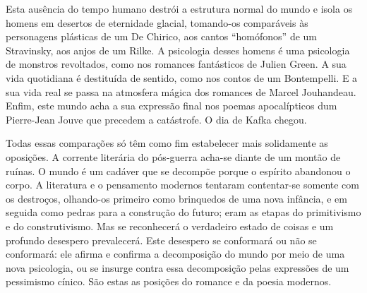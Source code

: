 


Esta ausência do tempo humano destrói a estrutura
normal do mundo e isola os
homens em desertos de eternidade glacial, tomando-os comparáveis às
personagens plásticas de um De Chirico, aos cantos ``homófonos'' de um
Stravinsky, aos anjos de um Rilke. A psicologia desses homens é uma
psicologia de monstros revoltados, como nos romances fantásticos de
Julien Green. A sua vida quotidiana é destituída de sentido, como nos
contos de um Bontempelli. E a sua vida real se
passa na atmosfera mágica dos romances de Marcel Jouhandeau. Enfim, este
mundo acha a sua expressão final nos poemas apocalípticos dum
Pierre-Jean Jouve que precedem a catástrofe. O dia de Kafka chegou.

Todas essas comparações só têm como fim estabelecer mais solidamente as oposições. A corrente literária do pós-guerra acha-se diante de um montão de 
ruínas. O mundo é um cadáver que se decompõe porque o espírito abandonou
o corpo. A literatura e o pensamento modernos tentaram contentar-se
somente com os destroços, olhando-os primeiro como brinquedos de uma
nova infância, e em seguida como pedras para a construção do futuro;
eram as etapas do primitivismo e do construtivismo. Mas se reconhecerá o
verdadeiro estado de coisas e um profundo desespero prevalecerá. Este
desespero se conformará ou não se conformará: ele afirma e confirma a
decomposição do mundo por meio de uma nova psicologia, ou se insurge
contra essa \mbox{decomposição} pelas expressões de um pessimismo cínico. São
estas as posições do romance e da poesia modernos.


